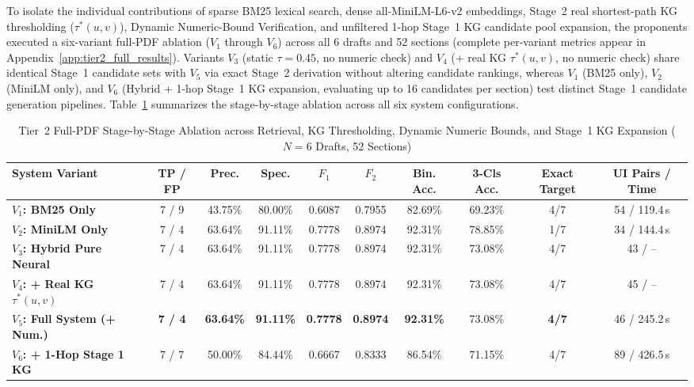 To isolate the individual contributions of sparse BM25 lexical search, dense all-MiniLM-L6-v2 embeddings, Stage~2 real shortest-path KG thresholding ($\tau^*(u, v)$), Dynamic Numeric-Bound Verification, and unfiltered 1-hop Stage~1 KG candidate pool expansion, the proponents executed a six-variant full-PDF ablation ($V_1$ through $V_6$) across all 6 drafts and 52 sections (complete per-variant metrics appear in Appendix~\ref{app:tier2_full_results}). Variants $V_3$ (static $\tau = 0.45$, no numeric check) and $V_4$ (+ real KG $\tau^*(u, v)$, no numeric check) share identical Stage~1 candidate sets with $V_5$ via exact Stage~2 derivation without altering candidate rankings, whereas $V_1$ (BM25 only), $V_2$ (MiniLM only), and $V_6$ (Hybrid + 1-hop Stage~1 KG expansion, evaluating up to 16 candidates per section) test distinct Stage~1 candidate generation pipelines. Table~\ref{tab:tier2_graph_ablation} summarizes the stage-by-stage ablation across all six system configurations.

\begin{table}[htbp]
    \centering
    \scriptsize
    \setlength{\tabcolsep}{2.5pt}
    \renewcommand{\arraystretch}{0.92}
    \caption[Tier 2 Full-PDF Stage-by-Stage Ablation Matrix]{Tier~2 Full-PDF Stage-by-Stage Ablation across Retrieval, KG Thresholding, Dynamic Numeric Bounds, and Stage~1 KG Expansion ($N = 6$ Drafts, 52 Sections)}
    \label{tab:tier2_graph_ablation}
    \begin{tabularx}{\linewidth}{>{\RaggedRight\arraybackslash}Xccccccccc}
        \toprule
        \textbf{System Variant} & \textbf{TP / FP} & \textbf{Prec.} & \textbf{Spec.} & \textbf{$F_1$} & \textbf{$F_2$} & \textbf{Bin. Acc.} & \textbf{3-Cls Acc.} & \textbf{Exact Target} & \textbf{UI Pairs / Time} \\
        \midrule
        \textbf{$V_1$: BM25 Only} & 7 / 9 & 43.75\% & 80.00\% & 0.6087 & 0.7955 & 82.69\% & 69.23\% & 4/7 & 54 / 119.4\,s \\
        \textbf{$V_2$: MiniLM Only} & 7 / 4 & 63.64\% & 91.11\% & 0.7778 & 0.8974 & 92.31\% & 78.85\% & 1/7 & 34 / 144.4\,s \\
        \textbf{$V_3$: Hybrid Pure Neural} & 7 / 4 & 63.64\% & 91.11\% & 0.7778 & 0.8974 & 92.31\% & 73.08\% & 4/7 & 43 / -- \\
        \textbf{$V_4$: + Real KG $\tau^*(u,v)$} & 7 / 4 & 63.64\% & 91.11\% & 0.7778 & 0.8974 & 92.31\% & 73.08\% & 4/7 & 45 / -- \\
        \textbf{$V_5$: Full System (+ Num.)} & \textbf{7 / 4} & \textbf{63.64\%} & \textbf{91.11\%} & \textbf{0.7778} & \textbf{0.8974} & \textbf{92.31\%} & 73.08\% & \textbf{4/7} & 46 / 245.2\,s \\
        \textbf{$V_6$: + 1-Hop Stage 1 KG} & 7 / 7 & 50.00\% & 84.44\% & 0.6667 & 0.8333 & 86.54\% & 71.15\% & 4/7 & 89 / 426.5\,s \\
        \bottomrule
    \end{tabularx}
\end{table}

